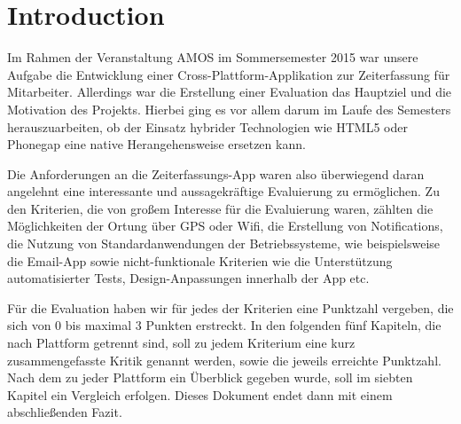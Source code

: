 \section{Introduction}
Im Rahmen der Veranstaltung AMOS im Sommersemester 2015 war unsere Aufgabe die Entwicklung einer Cross-Platt\-form-Applikation zur Zeiterfassung für Mitarbeiter. Allerdings war die Erstellung einer Evaluation das Hauptziel und die Motivation des Projekts. Hierbei ging es vor allem darum im Laufe des Semesters herauszuarbeiten, ob der Einsatz hybrider Technologien wie HTML5 oder Phonegap eine native Herangehensweise ersetzen kann.

Die Anforderungen an die Zeiterfassungs-App waren also überwiegend daran angelehnt eine interessante und aus\-sage\-kräftige Evaluierung zu ermöglichen. Zu den Kriterien, die von großem Interesse für die Evaluierung waren, zählten die Möglichkeiten der Ortung über GPS oder Wifi, die Erstellung von Notifications, die Nutzung von Standardanwendungen der Betriebssysteme, wie beispielsweise die Email-App sowie nicht-funktionale Kriterien wie die Unterstützung automatisierter Tests, Design-Anpassungen innerhalb der App etc.

Für die Evaluation haben wir für jedes der Kriterien eine Punktzahl vergeben, die sich von 0 bis maximal 3 Punkten erstreckt. In den folgenden fünf Kapiteln, die nach Plattform getrennt sind, soll zu jedem Kriterium eine kurz zusammengefasste Kritik genannt werden, sowie die jeweils erreichte Punktzahl. Nach dem zu jeder Plattform ein Überblick gegeben wurde, soll im siebten Kapitel ein Vergleich erfolgen. Dieses Dokument endet dann mit einem abschließenden Fazit.


